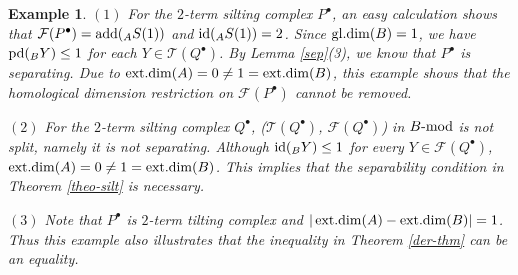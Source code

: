 \documentclass[12pt]{article}
\numberwithin{equation}{section}
\newtheorem{Bsp}[Def]{Example}%
\theoremstyle{definition}
\newcommand{\add}{{\rm add}}
\newcommand{\gd}{{\rm gl.dim }}
\def\ed{\mathop{\rm ext.dim}\nolimits}
\newcommand{\pd}{{\rm pd}}
\newcommand{\id}{{\rm id}}
\newcommand{\F}{{\mathcal F}}
\newcommand{\T}{{\mathcal T}}
\newcommand{\modcat}{\ensuremath{\mbox{{\rm -mod}}}}
\begin{document}
\begin{Bsp}
{$(1)$ For the $2$-term silting complex $P^{\bullet}$, an easy calculation shows that $\F(P^{\bullet})=\add(_AS(1))$ and $\id(_AS(1))=2$. Since $\gd(B)=1$, we have $\pd(_BY)\le 1$ for each $Y\in \T(Q^{\bullet})$. By Lemma \ref{sep}(3), we know that $P^{\bullet}$ is separating. Due to $\ed(A)=0\neq 1=\ed(B)$, this example shows that the homological dimension restriction on $\F(P^{\bullet})$ cannot be removed.

$(2)$ For the $2$-term silting complex $Q^{\bullet}$, ($\T(Q^{\bullet})$, $\F(Q^{\bullet})$) in $B\modcat$ is not split, namely it is not separating. Although $\id(_BY)\le 1$ for every $Y\in \F(Q^{\bullet})$, $\ed(A)=0\neq 1=\ed(B)$. This implies that the separability condition in Theorem \ref{theo-silt} is necessary.

$(3)$ Note that $P^{\bullet}$ is $2$-term tilting complex and $|\ed(A)-\ed(B)|=1$. Thus this example also illustrates that the inequality in Theorem \ref{der-thm} can be an equality.
}\end{Bsp}
\end{document}
